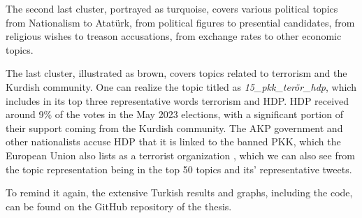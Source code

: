 The second last cluster, portrayed as turquoise, covers various political topics from Nationalism 
to Atatürk, from political figures to presential candidates, from religious wishes to treason 
accusations, from exchange rates to other economic topics. 

The last cluster, illustrated as brown, covers topics related to terrorism and the 
Kurdish community. One can realize the topic titled as \textit{15\_pkk\_terör\_hdp}, which includes 
in its top three representative words terrorism and \ac{HDP}. \ac{HDP} received around 9\% of 
the votes in the May 2023 elections, with a significant portion of their support coming 
from the Kurdish community. The AKP government and other nationalists accuse HDP that it is 
linked to the banned \ac{PKK}, which the European Union also lists as a ter­ror­ist organization 
\parencite{berk_esen_opposition_alliance_2023}, which we can also see from the topic representation
being in the top 50 topics and its' representative tweets.

To remind it again, the extensive Turkish results and graphs, including the code, can be found 
on the GitHub repository of the thesis.





